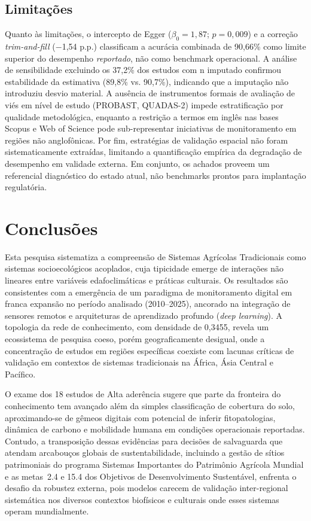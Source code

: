 \documentclass[lineno,pdflatex,sn-apa]{sn-jnl}%
\begin{document}
\subsection[Limitações]{Limitações}

Quanto às limitações, o intercepto de Egger ($\beta_0 = 1{,}87$; $p = 0{,}009$) e a correção \textit{trim-and-fill} ($-$1,54 p.p.) classificam a acurácia combinada de 90,66\% como limite superior do desempenho \textit{reportado}, não como benchmark operacional. A análise de sensibilidade excluindo os 37,2\% dos estudos com n imputado confirmou estabilidade da estimativa (89,8\% vs. 90,7\%), indicando que a imputação não introduziu desvio material. A ausência de instrumentos formais de avaliação de viés em nível de estudo (PROBAST, QUADAS-2) impede estratificação por qualidade metodológica, enquanto a restrição a termos em inglês nas bases Scopus e Web of Science pode sub-representar iniciativas de monitoramento em regiões não anglofônicas. Por fim, estratégias de validação espacial não foram sistematicamente extraídas, limitando a quantificação empírica da degradação de desempenho em validade externa. Em conjunto, os achados proveem um referencial diagnóstico do estado atual, não benchmarks prontos para implantação regulatória.

\section[Conclusões]{Conclusões}

Esta pesquisa sistematiza a compreensão de Sistemas Agrícolas Tradicionais como sistemas socioecológicos acoplados, cuja tipicidade emerge de interações não lineares entre variáveis edafoclimáticas e práticas culturais. Os resultados são consistentes com a emergência de um paradigma de monitoramento digital em franca expansão no período analisado (2010--2025), ancorado na integração de sensores remotos e arquiteturas de aprendizado profundo (\textit{deep learning}). A topologia da rede de conhecimento, com densidade de 0,3455, revela um ecossistema de pesquisa coeso, porém geograficamente desigual, onde a concentração de estudos em regiões específicas coexiste com lacunas críticas de validação em contextos de sistemas tradicionais na África, Ásia Central e Pacífico.

O exame dos 18 estudos de Alta aderência sugere que parte da fronteira do conhecimento tem avançado além da simples classificação de cobertura do solo, aproximando-se de gêmeos digitais com potencial de inferir fitopatologias, dinâmica de carbono e mobilidade humana em condições operacionais reportadas. Contudo, a transposição dessas evidências para decisões de salvaguarda que atendam arcabouços globais de sustentabilidade, incluindo a gestão de sítios patrimoniais do programa Sistemas Importantes do Patrimônio Agrícola Mundial e as metas~2.4 e 15.4 dos Objetivos de Desenvolvimento Sustentável, enfrenta o desafio da robustez externa, pois modelos carecem de validação inter-regional sistemática nos diversos contextos biofísicos e culturais onde esses sistemas operam mundialmente.
\end{document}
